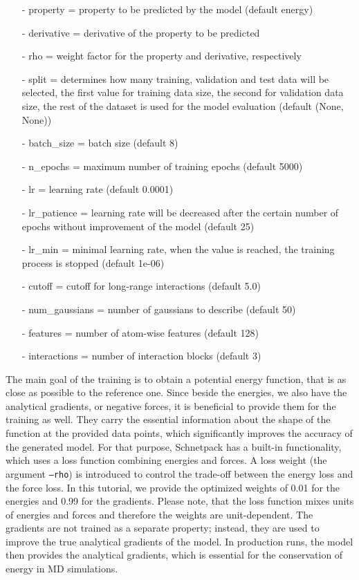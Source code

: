 \begin{enumerate}
    \item[-] property = property to be predicted by the model (default energy)
    \item[-] derivative = derivative of the property to be predicted
    \item[-] rho = weight factor for the property and derivative, respectively
    \item[-] split = determines how many training, validation and test data will be selected, the first value for training data size, the second for validation data size, the rest of the dataset is used for the model evaluation (default (None, None))
    \item[-] batch\_size = batch size (default 8)
    \item[-] n\_epochs = maximum number of training epochs (default 5000)
    \item[-] lr = learning rate (default 0.0001)
    \item[-] lr\_patience = learning rate will be decreased after the certain number of epochs without improvement of the model (default 25)
    \item[-] lr\_min = minimal learning rate, when the value is reached, the training process is stopped (default 1e-06)
    \item[-] cutoff = cutoff for long-range interactions (default 5.0)
    \item[-] num\_gaussians = number of gaussians to describe (default 50)
    \item[-] features = number of atom-wise features (default 128)
    \item[-] interactions = number of interaction blocks (default 3)
\end{enumerate}


The main goal of the training is to obtain a potential energy function, that is as close as possible to the reference one. Since beside the energies, we also have the analytical gradients, or negative forces, it is beneficial to provide them for the training as well. They carry the essential information about the shape of the function at the provided data points, which significantly improves the accuracy of the generated model. For that purpose, Schnetpack has a built-in functionality, which uses a loss function combining energies and forces. A loss weight (the argument \texttt{--rho}) is introduced to control the trade-off between the energy loss and the force loss. In this tutorial, we provide the optimized weights of 0.01 for the energies and 0.99 for the gradients. Please note, that the loss function mixes units of energies and forces and therefore the weights are unit-dependent. The gradients are not trained as a separate property; instead, they are used to improve the true analytical gradients of the model. In production runs, the model then provides the analytical gradients, which is essential for the conservation of energy in MD simulations.


